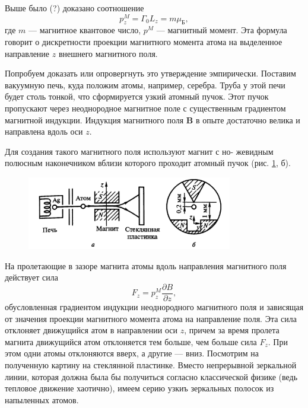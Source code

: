 Выше было (?) доказано соотношение 
\[
  p^M_z = \Gamma_0L_z = m\mu_{\text{Б}},
\]
где $ m $ --- магнитное квантовое число, $ p^M $ --- магнитный момент. Эта
формула говорит о дискретности проекции магнитного момента атома на выделенное
направление $ z $ внешнего магнитного поля.

Попробуем доказать или опровергнуть это утверждение эмпирически. Поставим
вакуумную печь, куда положим атомы, например, серебра. Труба у этой печи будет
столь тонкой, что сформируется узкий атомный пучок. Этот пучок пропускают через
неоднородное 
магнитное поле с существенным градиентом магнитной индукции. 
Индукция магнитного поля $ \mathbf B $ в опыте достаточно велика и направлена
вдоль оси $ z $.

Для создания такого магнитного поля используют магнит с но-
жевидным полюсным наконечником вблизи которого проходит
атомный пучок (рис. \ref{fig:puchok}, б).

\begin{figure}[h]
  \centering
  \includegraphics[width=0.8\textwidth]{img/oral-05/puchok.png}
  \label{fig:puchok}
\end{figure}

На пролетающие в зазоре магнита атомы вдоль направления магнитного поля
действует сила  
\[
    F_z = p_z^M \frac{\partial B}{\partial z},
\]
обусловленная градиентом индукции неоднородного магнитного
поля и зависящая от значения проекции магнитного момента 
атома на направление поля. Эта сила отклоняет движущийся атом в
направлении оси $ z $, причем за время пролета магнита движущийся
атом отклоняется тем больше, чем больше сила $ F_z $. При этом одни
атомы отклоняются вверх, а другие --- вниз. Посмотрим на полученную картину на
стеклянной пластинке. Вместо непрерывной зеркальной линии, которая должна была бы
получиться согласно классической физике (ведь тепловое движение хаотично), имеем серию узкиъ зеркальных полосок из
напыленных атомов.


